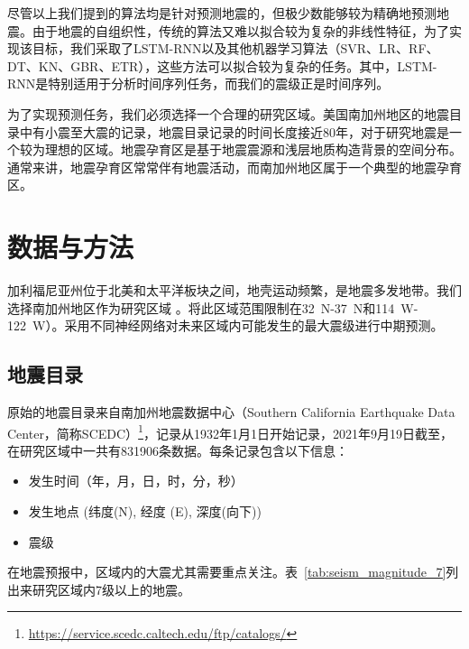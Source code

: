 尽管以上我们提到的算法均是针对预测地震的，但极少数能够较为精确地预测地震。由于地震的自组织性，传统的算法又难以拟合较为复杂的非线性特征，为了实现该目标，我们采取了LSTM-RNN\citep{Wang2017Earthquake,Bhatia2018EARTHQUAKE,berhich2020lstm}以及其他机器学习算法（SVR、LR、RF、DT、KN、GBR、ETR），这些方法可以拟合较为复杂的任务。其中，LSTM-RNN是特别适用于分析时间序列任务，而我们的震级正是时间序列\cite{Morales2010Pattern,Werner2009High}。

为了实现预测任务，我们必须选择一个合理的研究区域。美国南加州地区的地震目录中有小震至大震的记录，地震目录记录的时间长度接近80年，对于研究地震是一个较为理想的区域。地震孕育区是基于地震震源和浅层地质构造背景的空间分布。通常来讲，地震孕育区常常伴有地震活动，而南加州地区属于一个典型的地震孕育区。

\section{数据与方法}\label{sec:seis_deal_data}

加利福尼亚州位于北美和太平洋板块之间，地壳运动频繁，是地震多发地带。我们选择南加州地区作为研究区域
。将此区域范围限制在\SI{32}{N}-\SI{37}{N}和\SI{114}{W}-\SI{122}{W}）。采用不同神经网络对未来区域内可能发生的最大震级进行中期预测。


\subsection{地震目录}\label{sec:seis_catolog}

原始的地震目录来自南加州地震数据中心（Southern California Earthquake Data Center，简称SCEDC）\footnote{\href{https://service.scedc.caltech.edu/ftp/catalogs/}{https://service.scedc.caltech.edu/ftp/catalogs/}}，记录从1932年1月1日开始记录，2021年9月19日截至，在研究区域中一共有831906条数据。每条记录包含以下信息：
\begin{itemize}
\item[1] 发生时间（年，月，日，时，分，秒）
\item[2] 发生地点 (纬度(N), 经度 (E), 深度(向下))
\item[3] 震级
\end{itemize}
在地震预报中，区域内的大震尤其需要重点关注。表~\ref{tab:seism_magnitude_7}列出来研究区域内7级以上的地震。

